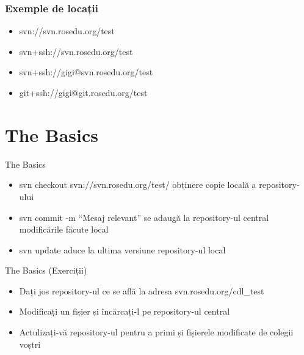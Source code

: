 \documentclass{beamer}
\begin{document}
\begin{frame}[allowframebreaks] %
\frametitle{Exemple de locații}
\begin{itemize}
\item svn://svn.rosedu.org/test
\newline 
\item svn+ssh://svn.rosedu.org/test
\newline 
\item svn+ssh://gigi@svn.rosedu.org/test
\newline 
\item git+ssh://gigi@git.rosedu.org/test
\end{itemize}
\end{frame}

\section{The Basics}
\frame{\tableofcontents[currentsection]}

\begin{frame}{The Basics}
\begin{itemize} %
\item svn checkout svn://svn.rosedu.org/test/
\newline obținere copie locală a repository-ului
\newline 
\item svn commit -m “Mesaj relevant”
\newline se adaugă la repository-ul central modificările    făcute local
\newline 
\item svn update
\newline aduce la ultima versiune repository-ul local
\end{itemize}
\end{frame}

\begin{frame}{The Basics (Exerciții)}
\begin{itemize} %
\item Dați jos repository-ul ce se află la adresa svn.rosedu.org/cdl\_test
\newline
\item Modificați un fișier și încărcați-l pe repository-ul central
\newline
\item Actulizați-vă repository-ul pentru a primi și fișierele modificate de colegii voștri
\end{itemize}
\end{frame}
\end{document}
